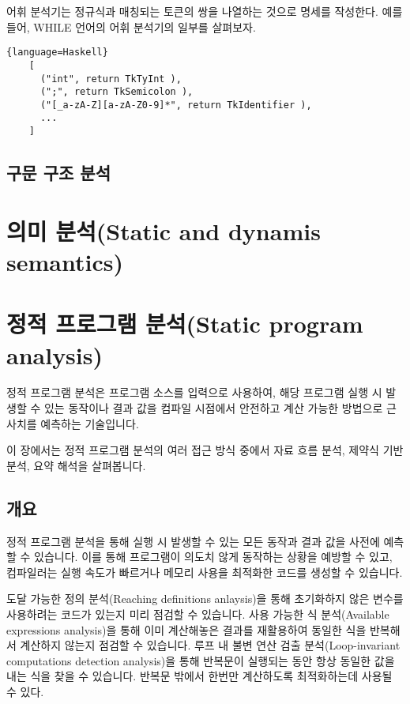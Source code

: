 \documentclass[a4paper]{book}
\begin{document}
어휘 분석기는 정규식과 매칭되는 토큰의 쌍을 나열하는 것으로 명세를
작성한다. 예를 들어, WHILE 언어의 어휘 분석기의 일부를 살펴보자.

\begin{center}
\begin{minipage}[h]{.7\textwidth}
  \begin{lstlisting}{language=Haskell}
    [
      ("int", return TkTyInt ),
      (";", return TkSemicolon ),
      ("[_a-zA-Z][a-zA-Z0-9]*", return TkIdentifier ),
      ...
    ]
  \end{lstlisting}
\end{minipage}
\end{center}

\section{구문 구조 분석}

\chapter{의미 분석(Static and dynamis semantics)}

\chapter{정적 프로그램 분석(Static program analysis)}

정적 프로그램 분석은 프로그램 소스를 입력으로 사용하여, 해당 프로그램
실행 시 발생할 수 있는 동작이나 결과 값을 컴파일 시점에서 안전하고
계산 가능한 방법으로 근사치를 예측하는 기술입니다.


이 장에서는 정적 프로그램 분석의 여러 접근 방식 중에서 자료 흐름 분석,
제약식 기반 분석, 요약 해석을 살펴봅니다.

\section{개요}

정적 프로그램 분석을 통해 실행 시 발생할 수 있는 모든 동작과 결과 값을
사전에 예측할 수 있습니다. 이를 통해 프로그램이 의도치 않게 동작하는
상황을 예방할 수 있고, 컴파일러는 실행 속도가 빠르거나 메모리 사용을
최적화한 코드를 생성할 수 있습니다.

도달 가능한 정의 분석(Reaching definitions anlaysis)을 통해 초기화하지
않은 변수를 사용하려는 코드가 있는지 미리 점검할 수 있습니다.
%
사용 가능한 식 분석(Available expressions analysis)을 통해 이미
계산해놓은 결과를 재활용하여 동일한 식을 반복해서 계산하지 않는지
점검할 수 있습니다.
%
루프 내 불변 연산 검출 분석(Loop-invariant computations detection
analysis)을 통해 반복문이 실행되는 동안 항상 동일한 값을 내는 식을
찾을 수 있습니다. 반복문 밖에서 한번만 계산하도록 최적화하는데 사용될
수 있다.
\end{document}
